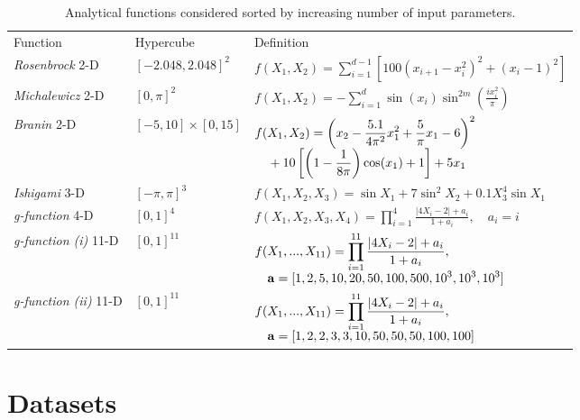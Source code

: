 \begin{table}[ht]
\centering
\setcellgapes{5pt}
\makegapedcells
\begin{tabular}{lll}
\toprule
Function&Hypercube & Definition \\
\cmidrule{1-3}
\textit{Rosenbrock} 2-D& $[-2.048, 2.048]^2$ & $
f(X_1, X_2) = \sum_{i = 1}^{d-1}[100(x_{i+1} - x_i^2)^2  +(x_i -1)^2]$\\
\textit{Michalewicz} 2-D& $[0, \pi]^2$ & $
f(X_1, X_2) = -\sum_{i=1}^d \sin(x_i)\sin^{2m}\left(\frac{ix_i^2}{\pi}\right)$\\
\textit{Branin} 2-D& $[-5, 10] \times [0, 15]$ &
$\begin{multlined}[t][0.6\linewidth]
f(X_1, X_2) = \left( x_2 - \frac{5.1}{4\pi^2}x_1^2 + \frac{5}{\pi}x_1 - 6
              \right)^2\\[-1ex]
+ 10 \left[ \left( 1 - \frac{1}{8\pi} \right) \cos(x_1) + 1 \right] + 5x_1\hfill
\end{multlined}$\\
\textit{Ishigami} 3-D& $[-\pi, \pi]^3$ & $ f(X_1, X_2, X_3) = \sin X_1 + 7 \sin^2 X_2 + 0.1 X_3^4 \sin X_1 $\\
\textit{g-function} 4-D& $[0, 1]^4$ & $
f(X_1, X_2, X_3, X_4) = \prod_{i=1}^4 \frac{\lvert 4X_i - 2\rvert + a_i}{1 + a_i}, \quad a_{i} = i$\\
\textit{g-function (i)} 11-D & $[0, 1]^{11}$ & 
$\begin{multlined}[t][0.6\linewidth]
f(X_1, ..., X_{11}) = \prod_{i=1}^{11} \frac{\lvert 4X_i - 2\rvert + a_i}{1 + a_i},\\[-1ex]
\hspace{0pt} \mathbf{a} = [1, 2, 5, 10, 20, 50, 100, 500, 10^3, 10^3, 10^3]\hfill
\end{multlined}$\\
\textit{g-function (ii)} 11-D & $[0, 1]^{11}$ &
$\begin{multlined}[t][0.6\linewidth]
f(X_1, ..., X_{11}) = \prod_{i=1}^{11} \frac{\lvert 4X_i - 2\rvert + a_i}{1 + a_i},\\[-1ex]
\hspace{0pt} \mathbf{a} = [1, 2, 2, 3, 3, 10, 50, 50, 50, 100, 100]\hfill
\end{multlined}$\\
\bottomrule
\end{tabular}
\caption{Analytical functions considered sorted by increasing number of input parameters.}
\label{tab:functions}
\end{table}

\section{Datasets}
\label{sec:dataset}

